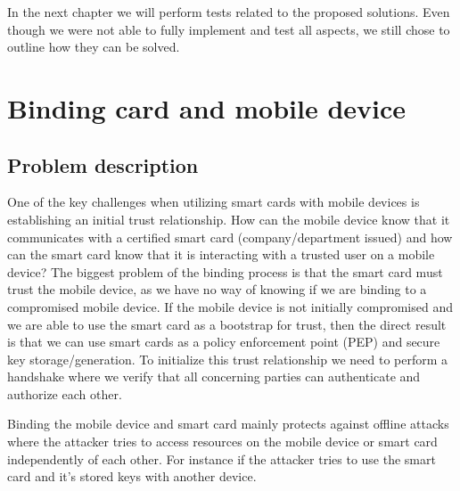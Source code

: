 In the next chapter we will perform tests related to the proposed solutions. Even though we were not able to fully implement and test all aspects, we still chose to outline how they can be solved.

\section{Binding card and mobile device}
\label{sec:bindingcardandphone}
\subsection{Problem description}
One of the key challenges when utilizing smart cards with mobile devices is establishing an initial trust relationship. How can the mobile device know that it communicates with a certified smart card (company/department issued) and how can the smart card know that it is interacting with a trusted user on a mobile device? The biggest problem of the binding process is that the smart card must trust the mobile device, as we have no way of knowing if we are binding to a compromised mobile device.  If the mobile device is not initially compromised and we are able to use the smart card as a bootstrap for trust, then the direct result is that we can use smart cards as a policy enforcement point (PEP) and secure key storage/generation. To initialize this trust relationship we need to perform a handshake where we verify that all concerning parties can authenticate and authorize each other.

Binding the mobile device and smart card mainly protects against offline attacks where the attacker tries to access resources on the mobile device or smart card independently of each other. For instance if the attacker tries to use the smart card and it's stored keys with another device.

